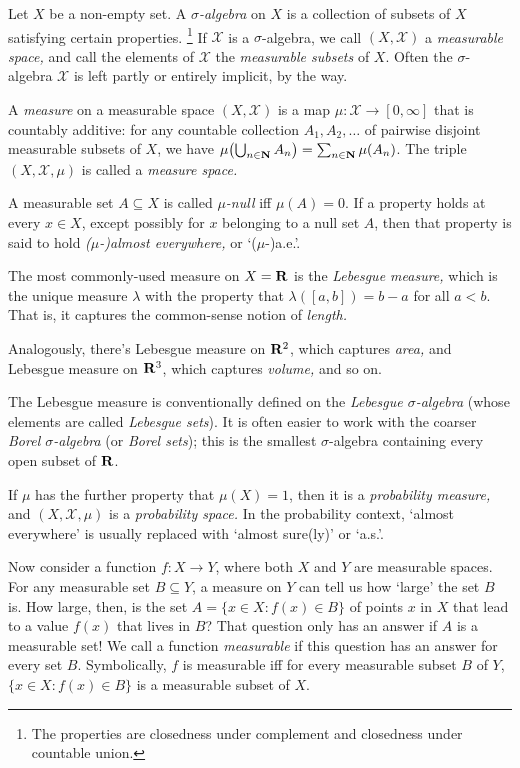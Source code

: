 \documentclass[11pt,letterpaper,reqno,oneside]{book}
\begin{document}
\begin{appendices}
Let $X$ be a non-empty set.
A \emph{$\sigma$-algebra} on $X$ is a collection of subsets of $X$ satisfying certain properties.%
	\footnote{The properties are closedness under complement and closedness under countable union.}
If $\mathcal{X}$ is a $\sigma$-algebra, we call $(X,\mathcal{X})$ a \emph{measurable space,} and call the elements of $\mathcal{X}$ the \emph{measurable subsets} of $X$.
Often the $\sigma$-algebra $\mathcal{X}$ is left partly or entirely implicit, by the way.

A \emph{measure} on a measurable space $(X,\mathcal{X})$ is a map $\mu : \mathcal{X} \to [0,\infty]$ that is countably additive:
for any countable collection $A_1,A_2,\dots$ of pairwise disjoint measurable subsets of $X$,
we have $\mu\left( \Union_{n \in \N} A_n \right) = \sum_{n \in \N} \mu(A_n)$.
The triple $(X,\mathcal{X},\mu)$ is called a \emph{measure space.}

A measurable set $A \subseteq X$ is called \emph{$\mu$-null} iff $\mu(A)=0$. If a property holds at every $x \in X$, except possibly for $x$ belonging to a null set $A$, then that property is said to hold \emph{($\mu$-)almost everywhere,} or `($\mu$-)a.e.'.

\begin{example}
	\label{example:lebesgue_measure}
	The most commonly-used measure on $X=\mathbf{R}$ is the \emph{Lebesgue measure,}
	which is the unique measure $\lambda$ with the property that
	$\lambda([a,b]) = b-a$ for all $a<b$.
	That is, it captures the common-sense notion of \emph{length.}

	Analogously, there's Lebesgue measure on $\mathbf{R}^2$, which captures \emph{area,} and Lebesgue measure on $\mathbf{R}^3$, which captures \emph{volume,} and so on.

	The Lebesgue measure is conventionally defined on the \emph{Lebesgue $\sigma$-algebra} (whose elements are called \emph{Lebesgue sets}).
	It is often easier to work with the coarser \emph{Borel $\sigma$-algebra} (or \emph{Borel sets}); this is the smallest $\sigma$-algebra containing every open subset of $\mathbf{R}$.
\end{example}

If $\mu$ has the further property that $\mu(X)=1$, then it is a \emph{probability measure,}
and $(X,\mathcal{X},\mu)$ is a \emph{probability space.}
In the probability context, `almost everywhere' is usually replaced with `almost sure(ly)' or `a.s.'.

Now consider a function $f : X \to Y$, where both $X$ and $Y$ are measurable spaces. For any measurable set $B \subseteq Y$, a measure on $Y$ can tell us how `large' the set $B$ is.
How large, then, is the set $A = \{ x \in X : f(x) \in B \}$ of points $x$ in $X$ that lead to a value $f(x)$ that lives in $B$?
That question only has an answer if $A$ is a measurable set!
We call a function \emph{measurable} if this question has an answer for every set $B$.
Symbolically, $f$ is measurable iff for every measurable subset $B$ of $Y$, $\{ x \in X : f(x) \in B \}$ is a measurable subset of $X$.


\end{appendices}
\end{document}
